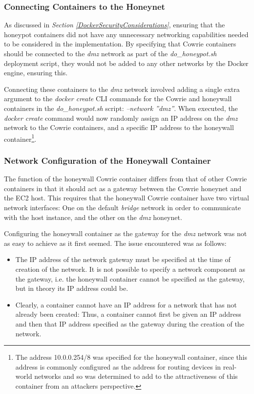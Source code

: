 \subsubsection{Connecting Containers to the Honeynet}
    
    As discussed in \textit{Section \ref{DockerSecurityConsiderations}}, ensuring that the honeypot containers did not have any unnecessary networking capabilities needed to be considered in the implementation. By specifying that Cowrie containers should be connected to the \textit{dmz} network as part of the \textit{do\_honeypot.sh} deployment script, they would not be added to any other networks by the Docker engine, ensuring this. 
    
    Connecting these containers to the \textit{dmz} network involved adding a single extra argument to the \textit{docker create} CLI commands for the Cowrie and honeywall containers in the \textit{do\_honeypot.sh} script: \textit{--network ''dmz''}. When executed, the \textit{docker create} command would now randomly assign an IP address on the \textit{dmz} network to the Cowrie containers, and a specific IP address to the honeywall container\footnote{The address 10.0.0.254/8 was specified for the honeywall container, since this address is commonly configured as the address for routing devices in real-world networks and so was determined to add to the attractiveness of this container from an attackers perspective.}. 
   

\subsubsection{Network Configuration of the Honeywall Container}
The function of the honeywall Cowrie container differs from that of other Cowrie containers in that it should act as a gateway between the Cowrie honeynet and the EC2 host. This requires that the honeywall Cowrie container have two virtual network interfaces: One on the default \textit{bridge} network in order to communicate with the host instance, and the other on the \textit{dmz} honeynet.

Configuring the honeywall container as the gateway for the \textit{dmz} network was not as easy to achieve as it first seemed. The issue encountered was as follows:
    \begin{itemize}
    \item The IP address of the network gateway must be specified at the time of creation of the network. It is not possible to specify a network component as the gateway, i.e. the honeywall container cannot be specified as the gateway, but in theory its IP address could be.
\item Clearly, a container cannot have an IP address for a network that has not already been created: Thus, a container cannot first be given an IP address and then that IP address specified as the gateway during the creation of the network.
    \end{itemize}
    
